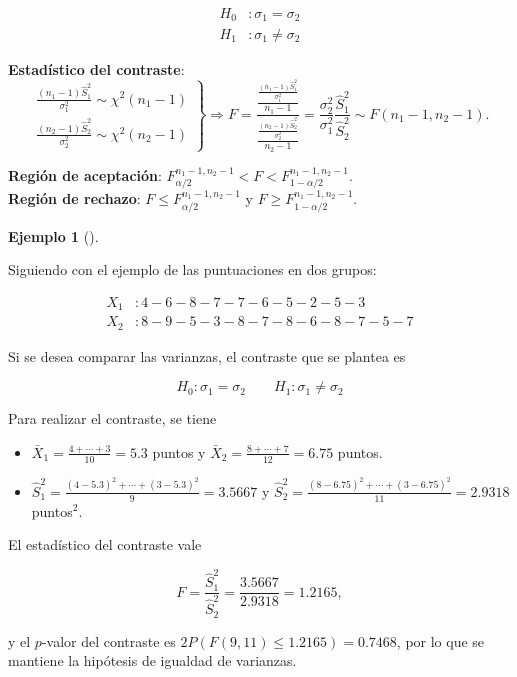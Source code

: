 \documentclass[
  a4paper,
]{scrreport}
\providecommand{\tightlist}{%
  \setlength{\itemsep}{0pt}\setlength{\parskip}{0pt}}\usepackage{longtable,booktabs,array}
\theoremstyle{plain}
\theoremstyle{definition}
\theoremstyle{definition}
\newtheorem{example}{Ejemplo}[chapter]
\theoremstyle{remark}
\begin{document}
\begin{align*}
H_0 &: \sigma_1=\sigma_2 \\
H_1 &: \sigma_1\neq \sigma_2
\end{align*}

\textbf{Estadístico del contraste}: \[\left.
\begin{array}{l}
\displaystyle \frac{(n_1-1)\hat{S}_1^2}{\sigma_1^2}\sim \chi^2(n_1-1) \\
\displaystyle \frac{(n_2-1)\hat{S}_2^2}{\sigma_2^2}\sim \chi^2(n_2-1)
\end{array}
\right\}
\Rightarrow
F= \frac{\frac{\frac{(n_1-1)\hat{S}_1^2}{\sigma_1^2}}{n_1-1}}{\frac{\frac{(n_2-1)\hat{S}_2^2}{\sigma_2^2}}{n_2-1}} =
\frac{\sigma_2^2}{\sigma_1^2}\frac{\hat{S}_1^2}{\hat{S}_2^2}\sim F(n_1-1,n_2-1).
\]

\textbf{Región de aceptación}:
\(F_{\alpha/2}^{n_1-1,n_2-1} < F < F_{1-\alpha/2}^{n_1-1,n_2-1}\).\\
\textbf{Región de rechazo}: \(F\leq F_{\alpha/2}^{n_1-1,n_2-1}\) y
\(F\geq F_{1-\alpha/2}^{n_1-1,n_2-1}\).

\begin{example}[]\protect\hypertarget{exm-contraste-comparacion-varianzas}{}\label{exm-contraste-comparacion-varianzas}

Siguiendo con el ejemplo de las puntuaciones en dos grupos:

\begin{align*}
X_1 &: 4 - 6 - 8 - 7 - 7 - 6 - 5 - 2 - 5 - 3  \\
X_2 &: 8 - 9 - 5 - 3 - 8 - 7 - 8 - 6 - 8 - 7 - 5 - 7
\end{align*}

Si se desea comparar las varianzas, el contraste que se plantea es

\[
H_0: \sigma_1=\sigma_2\qquad H_1: \sigma_1\neq \sigma_2
\]

Para realizar el contraste, se tiene

\begin{itemize}
\tightlist
\item
  \(\bar{X}_1 = \frac{4+\cdots +3}{10}=5.3\) puntos y
  \(\bar{X}_2=\frac{8+\cdots +7}{12}=6.75\) puntos.
\item
  \(\hat{S}_1^2= \frac{(4-5.3)^2+\cdots + (3-5.3)^2}{9}=3.5667\) y
  \(\hat{S}_2^2= \frac{(8-6.75)^2+\cdots + (3-6.75)^2}{11}=2.9318\)
  puntos\(^2\).
\end{itemize}

El estadístico del contraste vale

\[
F = \frac{\hat{S}_1^2}{\hat{S}_2^2} = \frac{3.5667}{2.9318}=1.2165,
\]

y el \(p\)-valor del contraste es \(2P(F(9,11)\leq 1.2165)=0.7468\), por
lo que se mantiene la hipótesis de igualdad de varianzas.

\end{example}
\end{document}
